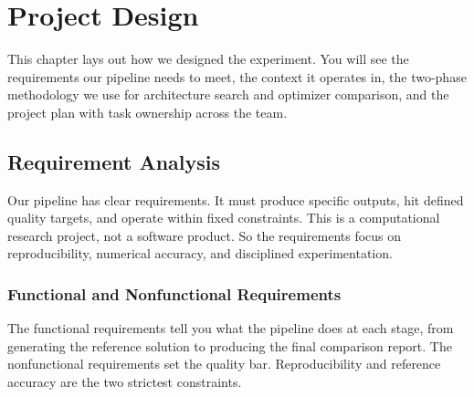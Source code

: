 \chapter{Project Design}

This chapter lays out how we designed the experiment. You will see the requirements our pipeline needs to meet, the context it operates in, the two-phase methodology we use for architecture search and optimizer comparison, and the project plan with task ownership across the team.

\section{Requirement Analysis}

Our pipeline has clear requirements. It must produce specific outputs, hit defined quality targets, and operate within fixed constraints. This is a computational research project, not a software product. So the requirements focus on reproducibility, numerical accuracy, and disciplined experimentation.

\subsection{Functional and Nonfunctional Requirements}

The functional requirements tell you what the pipeline does at each stage, from generating the reference solution to producing the final comparison report. The nonfunctional requirements set the quality bar. Reproducibility and reference accuracy are the two strictest constraints.

